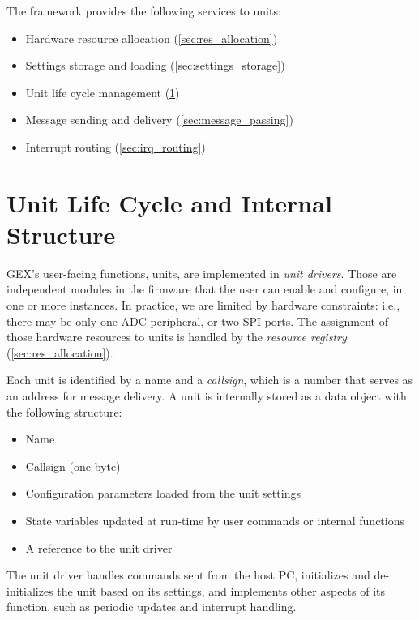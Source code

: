 \noindent
The framework provides the following services to units:

\begin{itemize}
	\item Hardware resource allocation (\cref{sec:res_allocation})
	\item Settings storage and loading (\cref{sec:settings_storage})
	\item Unit life cycle management (\cref{sec:units_function})
	\item Message sending and delivery (\cref{sec:message_passing})
	\item Interrupt routing (\cref{sec:irq_routing})
\end{itemize}

\section{Unit Life Cycle and Internal Structure} \label{sec:units_function}

GEX's user-facing functions, units, are implemented in \textit{unit drivers}. Those are independent modules in the firmware that the user can enable and configure, in one or more instances. In practice, we are limited by hardware constraints: i.e., there may be only one \gls{ADC} peripheral, or two \gls{SPI} ports. The assignment of those hardware resources to units is handled by the \textit{resource registry} (\cref{sec:res_allocation}).



Each unit is identified by a name and a \textit{callsign}, which is a number that serves as an address for message delivery. A unit is internally stored as a data object with the following structure:

\begin{itemize}[itemsep=0pt]
	\item Name
	\item Callsign (one byte)
	\item Configuration parameters loaded from the unit settings
	\item State variables updated at run-time by user commands or internal functions
	\item A reference to the unit driver
\end{itemize}

The unit driver handles commands sent from the host \gls{PC}, initializes and de-initializes the unit based on its settings, and implements other aspects of its function, such as periodic updates and interrupt handling. 


